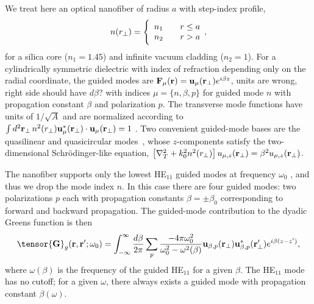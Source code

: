 \documentclass[preprint,aps,pra,onecolumn]{revtex4-1} %
\newcommand{\comment}[1]{{\color{Maroon} #1}}
\begin{document}
We treat here an optical nanofiber of radius $a$ with step-index profile,
	\begin{align}
		n(r_\perp) = \Bigg\{  
			\begin{array}{l l} n_1 & \quad r \leq a \\
						 n_2 & \quad r > a 
		\end{array},
	\end{align}
for a silica core ($n_1 = 1.45$) and infinite vacuum cladding ($n_2 = 1$).  For a cylindrically symmetric dielectric with index of refraction depending only on the radial coordinate, the guided modes are $\mathbf{F}_\mu (\mathbf{r}) = \mathbf{u}_\mu (\mathbf{r}_\perp) e^{i\beta z}$, \comment{units are wrong, right side should have $d\beta$?} with indices $\mu=\{n, \beta, p\}$ for guided mode $n$ with propagation constant $\beta$ and polarization $p$.  The transverse mode functions have units of $1/\sqrt{A}$ and are normalized according to $\int d^2 \mathbf{r}_\perp \, n^2(r_\perp)\mathbf{u}^*_\mu (\mathbf{r}_\perp) \cdot \mathbf{u}_\mu (\mathbf{r}_\perp) = 1$ \cite{le_kien_anisotropy_2014}.  Two convenient guided-mode bases are the quasilinear and quasicircular modes~\cite{kien_field_2004}, whose $z$-components satisfy the two-dimensional Schr\"{o}dinger-like equation, $\left[\nabla_T^2 +k_0^2 n^2(r_\perp) \right] u_{\mu,z} (\mathbf{r}_\perp) = \beta^2 u_{\mu,z} (\mathbf{r}_\perp)$.  

The nanofiber supports only the lowest HE$_{11}$ guided modes at frequency $\omega_0$  \cite{Yariv}, and thus we drop the mode index $n$.  In this case there are four guided modes: two polarizations $p$ each with propagation constants $\beta = \pm \beta_0$ corresponding to forward and backward propagation.  The guided-mode contribution to the dyadic Greens function is then 
\begin{equation} \label{Eq::GreensEigenmodes}
\tensor{\mathbf{G}}_g(\br,\br'; \omega_0) = \int_{-\infty}^\infty \frac{d \beta}{2 \pi} \sum_{p} 
\frac{-4\pi\omega_0^2}{\omega_0^2-\omega^2(\beta)} \mathbf{u}_{\beta,p} (\br_\perp)\mathbf{u}^*_{\beta,p} 
(\br_{\perp}^\prime) e^{i\beta(z-z')},
\end{equation}
where $ \omega(\beta)$ is the frequency of the guided HE$_{11}$ for a given $\beta$.  The 
HE$_{11}$ mode has no cutoff; for a given $\omega$, there always exists a guided mode with propagation 
constant $\beta(\omega)$.  
\end{document}
